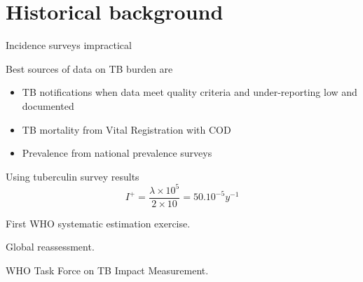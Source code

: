 \section{Historical background}

Incidence surveys impractical\cite{18201929}

Best sources of data on TB burden are 
\begin{itemize}
\item TB notifications when data meet quality criteria and under-reporting low and documented
\item TB mortality from Vital Registration with COD
\item Prevalence from national prevalence surveys
\end{itemize}

Using tuberculin survey results\cite{Styblo1985}
$$I^+ = \frac{\lambda \times 10^5}{2 \times 10} = 50.10^{-5} y^{-1}$$

First WHO systematic estimation exercise\cite{1600578}.

Global reassessment\cite{10517722}.

WHO Task Force on TB Impact Measurement.



  
  
  
  
  
  
  
  
  
  